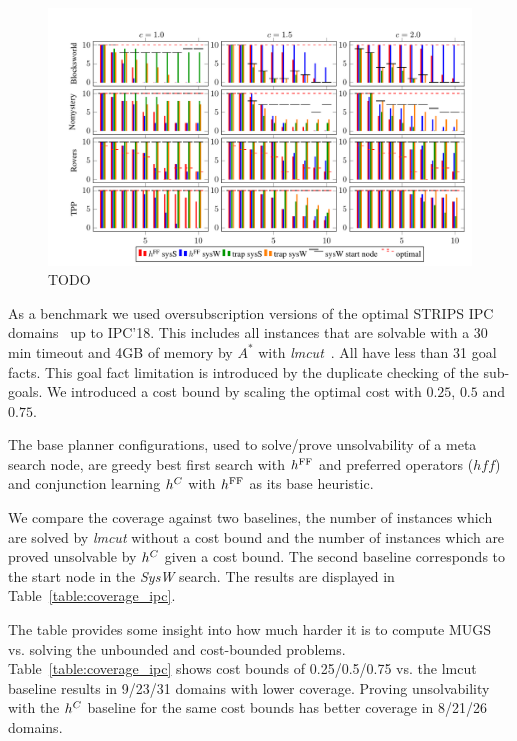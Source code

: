 \begin{figure}[t]
\centering\centering
%
\includegraphics{data/action_set_properties/barchart/barchart.pdf}
\caption{TODO}
\label{fig:barcharts}
\end{figure}


As a benchmark we used oversubscription versions of the optimal STRIPS IPC domains~ up to IPC'18. This includes all instances that are solvable with a 30 min timeout and 4GB of memory by $A^*$ with \emph{lmcut}~\cite{x}. All have less than 31 goal facts. This goal fact limitation is introduced by the duplicate checking of the sub-goals. We introduced a cost bound by scaling the optimal cost with $0.25$, $0.5$ and $0.75$.

The base planner configurations, used to solve/prove unsolvability of a meta search node,
are greedy best first search with $h^{\text{\textup{FF}}}$ and preferred operators ($hff$) and  
conjunction learning $h^C$ with $h^{\text{\textup{FF}}}$ as its base heuristic. 

We compare the coverage against two baselines, the number of instances which are solved by \emph{lmcut} without a cost bound and the number of instances which are proved unsolvable by $h^C$ given a cost bound. The second baseline corresponds to the start node in the \emph{SysW} search.
The results are displayed in Table~\ref{table:coverage_ipc}.

The table provides some insight into how much harder it is to compute MUGS vs. solving the unbounded and cost-bounded problems. Table~\ref{table:coverage_ipc} shows cost bounds of 0.25/0.5/0.75 vs. the lmcut baseline results in 9/23/31 domains with lower coverage.
Proving unsolvability with the $h^C$ baseline for the same cost bounds has better coverage in 8/21/26 domains.


